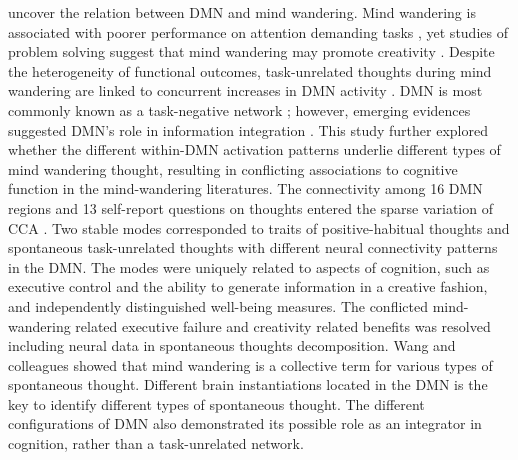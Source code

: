  uncover the relation between DMN and mind wandering. Mind wandering is associated with poorer performance on attention demanding tasks \cite{McVayJOEP2009,MrazekJoEP2012}, yet studies of problem solving suggest that mind wandering may promote creativity \cite{Baird2012,Smeekens2016}. Despite the heterogeneity of functional outcomes, task-unrelated thoughts during mind wandering are linked to concurrent increases in DMN activity \cite<see review from>{SmallwoodSchooler2015}. DMN is most commonly known as a task-negative network \cite{Fox2005}; however, emerging evidences suggested DMN’s role in information integration \cite{Margulies2016}. This study further explored whether the different within-DMN activation patterns underlie different types of mind wandering thought, resulting in conflicting associations to cognitive function in the mind-wandering literatures. The connectivity among 16 DMN regions and 13 self-report questions on thoughts entered the sparse variation of CCA \cite{WittenSCCA2009}. Two stable modes corresponded to traits of positive-habitual thoughts and spontaneous task-unrelated thoughts with different neural connectivity patterns in the DMN. The modes were uniquely related to aspects of cognition, such as executive control and the ability to generate information in a creative fashion, and independently distinguished well-being measures. The conflicted mind-wandering related executive failure and creativity related benefits was resolved including neural data in spontaneous thoughts decomposition. Wang and colleagues \cite{WangPsychScience2018} showed that mind wandering is a collective term for various types of spontaneous thought. Different brain instantiations located in the DMN is the key to identify different types of spontaneous thought. The different configurations of DMN also demonstrated its possible role as an integrator in cognition, rather than a task-unrelated network.



